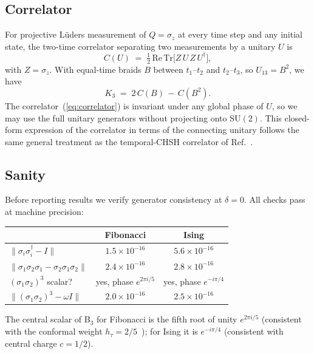 \documentclass[aps,prx,reprint,amsmath,amssymb,floatfix,nofootinbib,superscriptaddress]{revtex4-2}
\begin{document}
\subsection{Correlator}

For projective L\"uders measurement of $Q=\sigma_{z}$ at every time
step and any initial state, the two-time correlator separating two
measurements by a unitary $U$ is
\begin{equation}
  C(U) \;=\; \tfrac{1}{2}\,\mathrm{Re}\,\mathrm{Tr}\bigl[Z\,U\,Z\,U^{\dagger}\bigr],
\label{eq:correlator}
\end{equation}
with $Z=\sigma_{z}$. With equal-time braids $B$ between $t_{1}$--$t_{2}$
and $t_{2}$--$t_{3}$, so $U_{13}=B^{2}$, we have
\begin{equation}
  K_{3} \;=\; 2\,C(B) \,-\, C(B^{2}).
\end{equation}
The correlator~(\ref{eq:correlator}) is invariant under any global
phase of $U$, so we may use the full unitary generators without
projecting onto $\mathrm{SU}(2)$. This closed-form expression of the
correlator in terms of the connecting unitary follows the same
general treatment as the temporal-CHSH correlator of
Ref.~\cite{Fritz2010}.

\subsection{Sanity}

Before reporting results we verify generator consistency at $\delta =
0$. All checks
pass at machine precision:
\begin{center}\small
\begin{tabular}{lcc}
\toprule
& Fibonacci & Ising \\
\midrule
$\|\sigma_{i}\sigma_{i}^{\dagger}-I\|$ & $1.5\times10^{-16}$ & $5.6\times10^{-16}$ \\
$\|\sigma_{1}\sigma_{2}\sigma_{1}-\sigma_{2}\sigma_{1}\sigma_{2}\|$
                                      & $2.4\times10^{-16}$ & $2.8\times10^{-16}$ \\
$(\sigma_{1}\sigma_{2})^{3}$ scalar?  & yes, phase $e^{2\pi i/5}$
                                      & yes, phase $e^{-i\pi/4}$ \\
$\|(\sigma_{1}\sigma_{2})^{3}-\omega I\|$
                                      & $2.0\times10^{-16}$ & $2.5\times10^{-16}$ \\
\bottomrule
\end{tabular}
\end{center}
The central scalar of B$_{3}$ for Fibonacci is the fifth root of unity
$e^{2\pi i/5}$ (consistent with the conformal weight
$h_{\tau} = 2/5$~\cite{NayakSimonStern2008}); for Ising it is
$e^{-i\pi/4}$ (consistent with central charge $c=1/2$).
\end{document}
